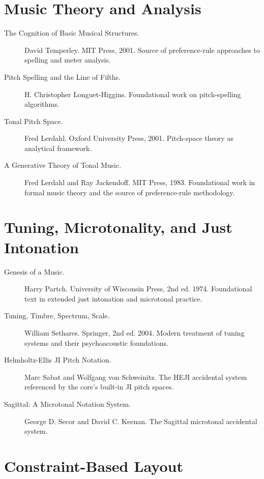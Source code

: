 \documentclass[11pt,letterpaper]{report}
\begin{document}
\section*{Music Theory and Analysis}

\begin{description}
  \item[The Cognition of Basic Musical Structures.]
    David Temperley. MIT Press, 2001. Source of preference-rule
    approaches to spelling and meter analysis.
  \item[Pitch Spelling and the Line of Fifths.]
    H. Christopher Longuet-Higgins. Foundational work on
    pitch-spelling algorithms.
  \item[Tonal Pitch Space.] Fred Lerdahl. Oxford University Press,
    2001. Pitch-space theory as analytical framework.
  \item[A Generative Theory of Tonal Music.]
    Fred Lerdahl and Ray Jackendoff. MIT Press, 1983. Foundational
    work in formal music theory and the source of preference-rule
    methodology.
\end{description}

\section*{Tuning, Microtonality, and Just Intonation}

\begin{description}
  \item[Genesis of a Music.] Harry Partch. University of Wisconsin
    Press, 2nd ed. 1974. Foundational text in extended just
    intonation and microtonal practice.
  \item[Tuning, Timbre, Spectrum, Scale.] William Sethares.
    Springer, 2nd ed. 2004. Modern treatment of tuning systems
    and their psychoacoustic foundations.
  \item[Helmholtz-Ellis JI Pitch Notation.] Marc Sabat and
    Wolfgang von Schweinitz. The HEJI accidental system referenced
    by the core's built-in JI pitch spaces.
  \item[Sagittal: A Microtonal Notation System.] George D. Secor
    and David C. Keenan. The Sagittal microtonal accidental system.
\end{description}

\section*{Constraint-Based Layout}
\end{document}
